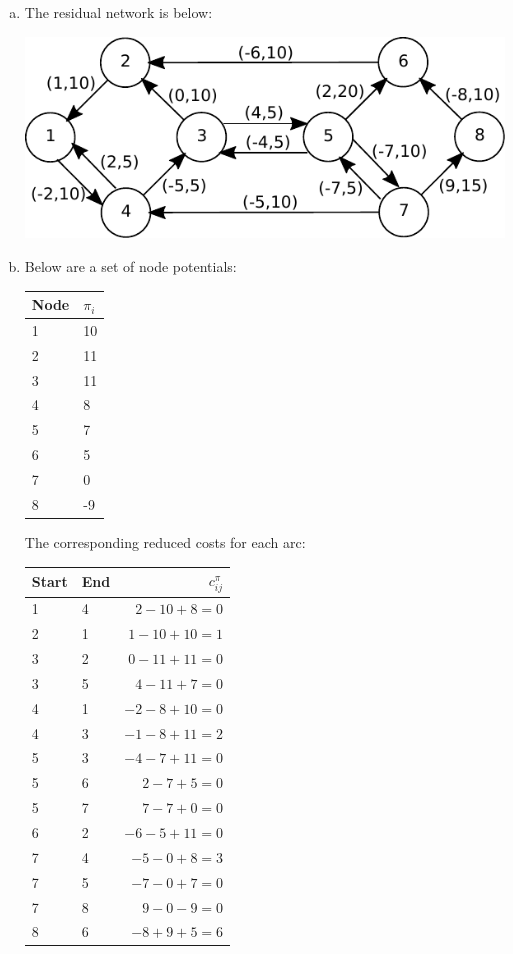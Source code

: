 \documentclass[fleqn]{homework}
\begin{document}
\begin{problem}{4}
    \begin{enumerate}[a.]
    \item The residual network is below:

      \includegraphics{problem4.pdf}

    \item Below are a set of node potentials:

      \begin{tabular}{ll}
        \hline
        Node & $\pi_i$ \\
        \hline
        1 & 10 \\
        2 & 11 \\
        3 & 11 \\
        4 & 8 \\
        5 & 7 \\
        6 & 5 \\
        7 & 0 \\
        8 & -9 \\
        \hline
      \end{tabular}

      The corresponding reduced costs for each arc:

      \begin{tabular}{llr}
        \hline
        Start & End & $c_{ij}^{\pi}$ \\
        \hline
        1 & 4 & $2-10+8=0$ \\
        2 & 1 & $1-10+10=1$ \\
        3 & 2 & $0-11+11=0$ \\
        3 & 5 & $4-11+7=0$ \\
        4 & 1 & $-2-8+10=0$ \\
        4 & 3 & $-1-8+11=2$ \\
        5 & 3 & $-4-7+11=0$ \\
        5 & 6 & $2-7+5=0$ \\
        5 & 7 & $7-7+0=0$ \\
        6 & 2 & $-6-5+11=0$ \\
        7 & 4 & $-5-0+8=3$ \\
        7 & 5 & $-7-0+7=0$ \\
        7 & 8 & $9-0-9=0$ \\
        8 & 6 & $-8+9+5=6$ \\
        \hline
      \end{tabular}


\end{enumerate}
\end{problem}
\end{document}

